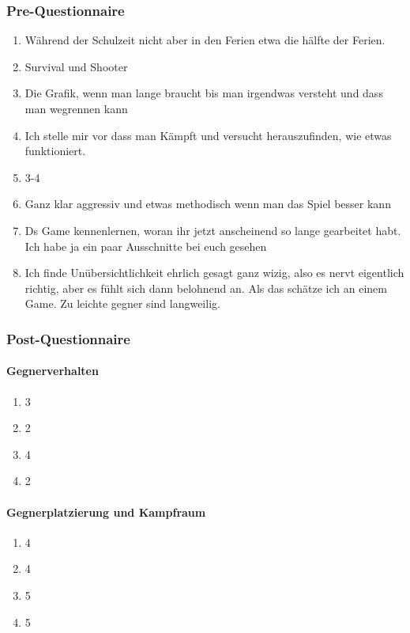 \documentclass[../Main.tex]{subfiles}
\begin{document}
\subsubsection{Pre-Questionnaire}

\begin{enumerate}[label=\textbf{P\arabic*}, leftmargin=1.5cm, itemsep=0.5em]
    \item Während der Schulzeit nicht aber in den Ferien etwa die hälfte der Ferien.
    \item Survival und Shooter
    \item Die Grafik, wenn man lange braucht bis man irgendwas versteht und dass man wegrennen kann
    \item Ich stelle mir vor dass man Kämpft und versucht herauszufinden, wie etwas funktioniert.
    \item 3-4
    \item Ganz klar aggressiv und etwas methodisch wenn man das Spiel besser kann
    \item Ds Game kennenlernen, woran ihr jetzt anscheinend so lange gearbeitet habt. Ich habe ja ein paar Ausschnitte bei euch gesehen
    \item Ich finde Unübersichtlichkeit ehrlich gesagt ganz wizig, also es nervt eigentlich richtig, aber es fühlt sich dann belohnend an. Als das schätze ich an einem Game. Zu leichte gegner sind langweilig.
\end{enumerate}

\subsubsection{Post-Questionnaire}

\paragraph{Gegnerverhalten}
\begin{enumerate}[label=\textbf{Q\arabic*}, leftmargin=1.5cm, itemsep=0.5em]
    \item 3
    \item 2
    \item 4
    \item 2
\end{enumerate}

\paragraph{Gegnerplatzierung und Kampfraum}
\begin{enumerate}[label=\textbf{Q\arabic*}, leftmargin=1.5cm, itemsep=0.5em, resume]
    \item 4
    \item 4
    \item 5
    \item 5
\end{enumerate}
\end{document}
